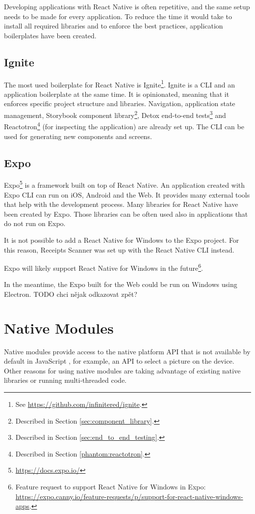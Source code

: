 \documentclass[
  digital, %
  table,   %
  oneside, %
  lof,     %
  lot,     %
]{fithesis3}
\begin{document}
Developing applications with React Native is often repetitive, and the same setup needs to be made for every application. To reduce the time it would take to install all required libraries and to enforce the best practices, application boilerplates have been created.

\subsection{Ignite}
The most used boilerplate for React Native is Ignite\footnote{See \url{https://github.com/infinitered/ignite}.}.
Ignite is a CLI and an application boilerplate at the same time. It is opinionated, meaning that it enforces specific project structure and libraries. Navigation, application state management, Storybook component library\footnote{Described in Section \ref{sec:component_library}.}, Detox end-to-end tests\footnote{Described in Section \ref{sec:end_to_end_testing}.} and Reactotron\footnote{Described in Section \ref{phantom:reactotron}.} (for inspecting the application) are already set up. The CLI can be used for generating new components and screens.

\subsection{Expo}
Expo\footnote{\url{https://docs.expo.io/}} is a framework built on top of React Native. An application created with Expo CLI can run on iOS, Android and the Web. It provides many external tools that help with the development process. 
Many libraries for React Native have been created by Expo. Those libraries can be often used also in applications that do not run on Expo.

It is not possible to add a React Native for Windows to the Expo project. For this reason, Receipts Scanner was set up with the React Native CLI instead.

Expo will likely support React Native for Windows in the future\footnote{Feature request to support React Native for Windows in Expo: \url{https://expo.canny.io/feature-requests/p/support-for-react-native-windows-apps}.}.

In the meantime, the Expo built for the Web could be run on Windows using Electron. TODO chci nějak odkazovat zpět?

\section{Native Modules}
Native modules provide access to the native platform API that is not available by default in JavaScript \cite{RNNativeModulesIntro}, for example, an API to select a picture on the device. Other reasons for using native modules are taking advantage of existing native libraries or running multi-threaded code.
\end{document}
